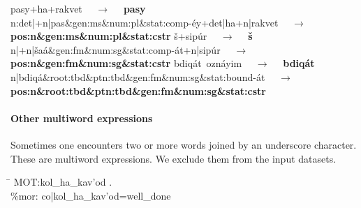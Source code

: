 
\begin{exe}
\ex \label{ex:cstr:pasey2}
	\textsf{pasy+ha+rakvet} $\quad\to\quad$ 
	\textbf{\textsf{pasy}} \\
	\textsf{n:det|+n|pas\&gen:ms\&num:pl\&stat:comp-\'{e}y+det|ha+n|rakvet} $\quad\to\quad$ \\
	\textbf{\textsf{pos:n\&gen:ms\&num:pl\&stat:cstr}}
\ex \label{ex:cstr:shaat2} 
	\textsf{\v{s}+sip\'{u}r} $\quad\to\quad$ \textbf{\textsf{\v{s}}}\\
	\textsf{n|+n|\v{s}a\'a\&gen:fm\&num:sg\&stat:comp-\'at+n|sip\'ur} $\quad\to\quad$ \\
	\textbf{\textsf{pos:n\&gen:fm\&num:sg\&stat:cstr}}
\ex \label{ex:cstr:bdiqat2} 
	\textsf{bdiq\'{a}t\, ozn\'{a}yim} $\quad\to\quad$ \textbf{\textsf{\textsf{bdiq\'{a}t}}} \\ 
	\textsf{n|bdiq\'{a}\&root:tbd\&ptn:tbd\&gen:fm\&num:sg\&stat:bound-\'{a}t} $\quad\to\quad$ \\
	\textbf{\textsf{pos:n\&root:tbd\&ptn:tbd\&gen:fm\&num:sg\&stat:cstr}}
\end{exe}

\paragraph{Other multiword expressions} Sometimes one encounters two or more words joined 
by an underscore character. These are multiword expressions. We exclude them from
the input datasets. 
\begin{exe}
\ex \begin{tabbing}
\hspace{0.6in} \= \hspace{5.5in} \kill
\textsf{\*MOT:}\>\textsf{kol\_ha\_kav\a'{o}d .} \\
\textsf{\%mor:} \> \textsf{co|kol\_ha\_kav\a'{o}d=well\_done}
\end{tabbing}
\end{exe}



